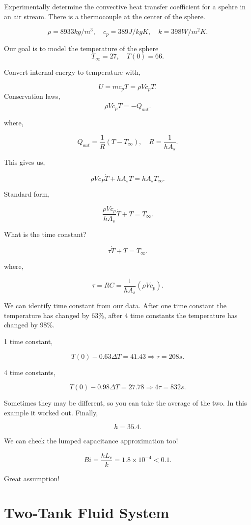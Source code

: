 \documentclass[12pt, a4paper]{report}
\begin{document}
  Experimentally determine the convective heat transfer coefficient for a spehre in an air stream. There is a thermocouple at the center of the sphere.

  \[
      \rho = 8933 kg/m^3, \quad c_p = 389 J/kgK, \quad k = 398 W/m^2K
    .\]

  Our goal is to model the temperature of the sphere
  \[
      T_{\infty} = 27, \quad T(0) = 66
    .\]

  Convert internal energy to temperature with,

  \[
      U = mc_pT = \rho Vc_pT
    .\]
  Conservation laws,
  \[
      \rho Vc_p \dot T = -Q_{out}
    .\]

  where,

  \[
      Q_{out} = \frac{1}{R}(T - T_{\infty}), \quad R = \frac{1}{hA_s}
    .\]

  This gives us,

  \[
      \rho Vc_P \dot T + hA_sT = hA_s T_{\infty}
    .\]

  Standard form,

  \[
      \frac{\rho Vc_p}{hA_s} \dot T + T = T_{\infty}
    .\]

  What is the time constant?

  \[
      \tau \dot T + T = T_{\infty}
    .\]

  where,

  \[
      \tau = RC = \frac{1}{hA_s}(\rho Vc_p)
    .\]

  We can identify time constant from our data. After one time constant the temperature has changed by 63\%, after 4 time constants the temperature has changed by 98\%.

  1 time constant,

  \[
      T(0) - 0.63\Delta T = 41.43 \Rightarrow \tau = 208s
    .\]

  4 time constants,

  \[
      T(0) - 0.98\Delta T = 27.78 \Rightarrow 4\tau = 832s
    .\]

  Sometimes they may be different, so you can take the average of the two. In this example it worked out. Finally,

  \[
      h = 35.4
    .\]

  We can check the lumped capacitance approximation too!

  \[
      Bi = \frac{hL_c}{k} = 1.8 \times 10^{-4} < 0.1
    .\]

  Great assumption!

  \section{Two-Tank Fluid System}
\end{document}
